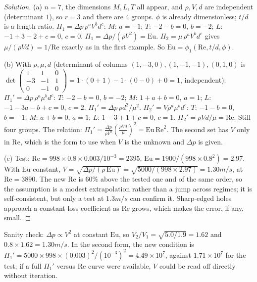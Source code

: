 \begin{proof}[Solution]
(a) $n = 7$, the dimensions $M, L, T$ all appear, and $\rho, V, d$ are independent (determinant $1$), so $r = 3$ and there are $4$ groups. $\phi$ is already dimensionless; $t/d$ is a length ratio.
$\Pi_1 = \Delta p\,\rho^aV^bd^c$: $M$: $a = -1$; $T$: $-2 - b = 0$, $b = -2$; $L$: $-1 + 3 - 2 + c = 0$, $c = 0$. $\Pi_1 = \Delta p/(\rho V^2) = \mathrm{Eu}$.
$\Pi_2 = \mu\,\rho^aV^bd^c$ gives $\mu/(\rho V d) = 1/\mathrm{Re}$ exactly as in the first example.
So $\mathrm{Eu} = \phi_1(\mathrm{Re}, t/d, \phi)$.

(b) With $\rho, \mu, d$ (determinant of columns $(1,-3,0), (1,-1,-1), (0,1,0)$ is $\det\begin{pmatrix}1&1&0\\-3&-1&1\\0&-1&0\end{pmatrix} = 1\cdot(0+1) - 1\cdot(0-0) + 0 = 1$, independent):
$\Pi_1' = \Delta p\,\rho^a\mu^bd^c$: $T$: $-2 - b = 0$, $b = -2$; $M$: $1 + a + b = 0$, $a = 1$; $L$: $-1 - 3a - b + c = 0$, $c = 2$. $\Pi_1' = \Delta p\,\rho d^2/\mu^2$.
$\Pi_2' = V\rho^a\mu^bd^c$: $T$: $-1 - b = 0$, $b = -1$; $M$: $a + b = 0$, $a = 1$; $L$: $1 - 3 + 1 + c = 0$, $c = 1$. $\Pi_2' = \rho V d/\mu = \mathrm{Re}$.
Still four groups. The relation: $\Pi_1' = \frac{\Delta p}{\rho V^2}\left(\frac{\rho V d}{\mu}\right)^2 = \mathrm{Eu}\,\mathrm{Re}^2$. The second set has $V$ only in $\mathrm{Re}$, which is the form to use when $V$ is the unknown and $\Delta p$ is given.

(c) Test: $\mathrm{Re} = 998 \times 0.8 \times 0.003/10^{-3} = 2395$, $\mathrm{Eu} = 1900/(998 \times 0.8^2) = 2.97$. With $\mathrm{Eu}$ constant, $V = \sqrt{\Delta p/(\rho\,\mathrm{Eu})} = \sqrt{5000/(998 \times 2.97)} = 1.30\unit{m/s}$, at $\mathrm{Re} = 3890$. The new $\mathrm{Re}$ is $60\%$ above the tested one and of the same order, so the assumption is a modest extrapolation rather than a jump across regimes; it is self-consistent, but only a test at $1.3\unit{m/s}$ can confirm it. Sharp-edged holes approach a constant loss coefficient as $\mathrm{Re}$ grows, which makes the error, if any, small.
\end{proof}

Sanity check: $\Delta p \propto V^2$ at constant $\mathrm{Eu}$, so $V_2/V_1 = \sqrt{5.0/1.9} = 1.62$ and $0.8 \times 1.62 = 1.30\unit{m/s}$. In the second form, the new condition is $\Pi_1' = 5000 \times 998 \times (0.003)^2/(10^{-3})^2 = 4.49\times10^7$, against $1.71\times10^7$ for the test; if a full $\Pi_1'$ versus $\mathrm{Re}$ curve were available, $V$ could be read off directly without iteration.


